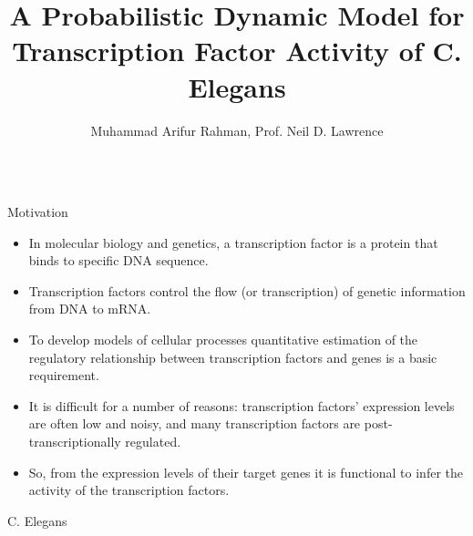 \documentclass[serif,mathserif,final]{beamer}
\title{A Probabilistic Dynamic Model for Transcription Factor Activity of C. Elegans}
\author{Muhammad Arifur Rahman, Prof. Neil D. Lawrence}
\institute{Sheffield Institute for Translational Neuroscience \\ The University of Sheffield, UK}
\begin{document}
\begin{frame}{}
  \begin{columns}[t]

  

    \begin{column}{0.24\linewidth}

      \begin{block}{Motivation}
        
        \begin{itemize}

	  \item In molecular biology and genetics, a transcription factor is a protein that binds to specific DNA sequence.
	  \item Transcription factors control the flow (or transcription) of genetic information from DNA to mRNA. 
	  \item To develop models of cellular processes quantitative estimation of the regulatory relationship between transcription factors and genes is a basic requirement. 
	  \item It is difficult for a number of reasons: transcription factors’ expression levels are often low and noisy, and many transcription factors are post- transcriptionally regulated. 
	  \item So, from the expression levels of their target genes it is functional to infer the activity of the transcription factors.

	\end{itemize}
        
      \end{block}

      \begin{block}{C. Elegans}

	\begin{columns}[c] %


\end{columns}
\end{block}
\end{column}
\end{columns}
\end{frame}
\end{document}
